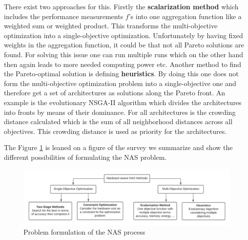 \documentclass[conference]{IEEEtran}
\begin{document}
There exist two approaches for this. Firstly the \textbf{scalarization method} which includes the performance measurements $f$'s into one aggregation function like a weighted sum or weighted product. This transforms the multi-objective optimization into a single-objective optimization. Unfortunately by having fixed weights in the aggregation function, it could be that not all Pareto solutions are found. For solving this issue one can run multiple runs which on the other hand then again leads to more needed computing power etc. Another method to find the Pareto-optimal solution is defining \textbf{heuristics}. By doing this one does not form the multi-objective optimization problem into a single-objective one and therefore get a set of architectures as solutions along the Pareto front. An example is the evolutionary NSGA-II algorithm \cite{bib14} which divides the architectures into fronts by means of their dominance. For all architectures is the crowding distance calculated which is the sum of all neighborhood distances across all objectives. This crowding distance is used as priority for the architectures.  

The Figure \ref{fig:ProblemFormulation} is leaned on a figure of the survey \cite{bib1} we summarize and show the different possibilities of formulating the NAS problem.

\begin{figure}[htbp]
\includegraphics[width=\textwidth]{ProblemFormulation.png}
\caption{Problem formulation of the NAS process \cite{bib1}}
\label{fig:ProblemFormulation}
\end{figure} 
\end{document}
